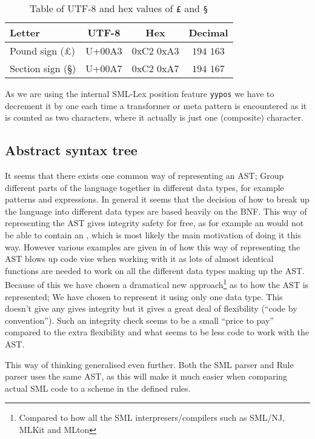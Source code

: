 \begin{table}
  \centering
  \begin{tabular}{|l|c|c|c|}
    \hline
    \textbf{Letter} & \textbf{UTF-8} & \textbf{Hex} & \textbf{Decimal} \\ \hline
    Pound sign (£)   & U+00A3 & 0xC2 0xA3 &  $194$ $163$ \\ \hline
    Section sign (§) & U+00A7 & 0xC2 0xA7 & $194$ $167$ \\ \hline
  \end{tabular}

  \caption{Table of UTF-8 and hex values of \texttt{£} and \texttt{§}}
  \label{tab:utf8-rule-values}
\end{table}

As we are using the internal SML-Lex position feature \texttt{yypos} we have to
decrement it by one each time a transformer or meta pattern is encountered as it
is counted as two characters, where it actually is just one (composite)
character.

\subsection{Abstract syntax tree}

It seems that there exists one common way of representing an AST; Group
different parts of the language together in different data types, for example
patterns and expressions. In general it seems that the decision of how to break
up the language into different data types are based heavily on the BNF. This way
of representing the AST gives integrity safety for free, as for example an
 would not be able to contain an , which is most likely
the main motivation of doing it this way. However various examples are given in
\cite{mbp08} of how this way of representing the AST blows up code
vise when working with it as lots of almost identical functions are needed to
work on all the different data types making up the AST. Because of this we have
chosen a dramatical new approach\footnote{Compared to how all the SML
  interpresers/compilers such as SML/NJ, MLKit and MLton} as to how the AST is
represented; We have chosen to represent it using only one data type. This
doesn't give any gives integrity but it gives a great deal of flexibility
(``code by convention''). Such an integrity check seems to be a small ``price to
pay'' compared to the extra flexibility and what seems to be less code to work
with the AST.


This way of thinking generalised even further. Both the SML parser and Rule
parser uses the same AST, as this will make it much easier when comparing actual
SML code to a scheme in the defined rules.


